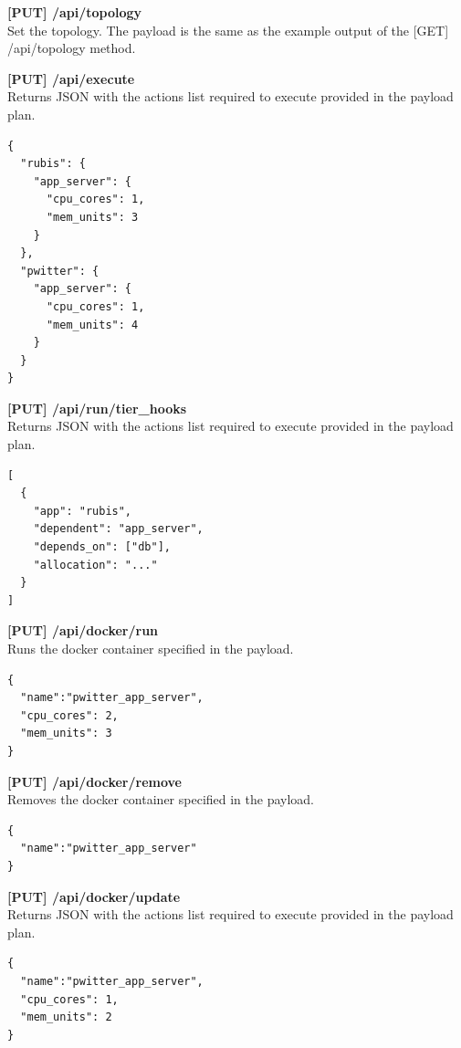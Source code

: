 \vspace{5mm}
\noindent\textbf{[PUT] /api/topology} \\
Set the topology. The payload is the same as the example output of the [GET] /api/topology method.

\vspace{5mm}
\noindent\textbf{[PUT] /api/execute} \\
Returns JSON with the actions list required to execute provided in the payload plan.
\begin{lstlisting}[caption=Example of the input payload,basicstyle=\tiny]
{
  "rubis": {
    "app_server": {
      "cpu_cores": 1,
      "mem_units": 3
    }
  },
  "pwitter": {
    "app_server": {
      "cpu_cores": 1,
      "mem_units": 4  
    }
  }
}
\end{lstlisting}

\vspace{5mm}
\noindent\textbf{[PUT] /api/run/tier\_hooks} \\
Returns JSON with the actions list required to execute provided in the payload plan.
\begin{lstlisting}[caption=Example of the input payload,basicstyle=\tiny]
[
  {
    "app": "rubis",
    "dependent": "app_server",
    "depends_on": ["db"],
    "allocation": "..."
  }
]
\end{lstlisting}

\vspace{5mm}
\noindent\textbf{[PUT] /api/docker/run} \\
Runs the docker container specified in the payload.
\begin{lstlisting}[caption=Example of the input payload,basicstyle=\tiny]
{
  "name":"pwitter_app_server",
  "cpu_cores": 2,
  "mem_units": 3
}
\end{lstlisting}

\noindent\textbf{[PUT] /api/docker/remove} \\
Removes the docker container specified in the payload.
\begin{lstlisting}[caption=Example of the input payload,basicstyle=\tiny]
{  
  "name":"pwitter_app_server"
}
\end{lstlisting}

\noindent\textbf{[PUT] /api/docker/update} \\
Returns JSON with the actions list required to execute provided in the payload plan.
\begin{lstlisting}[caption=Example of the input payload,basicstyle=\tiny]
{  
  "name":"pwitter_app_server",
  "cpu_cores": 1,
  "mem_units": 2
}
\end{lstlisting}


